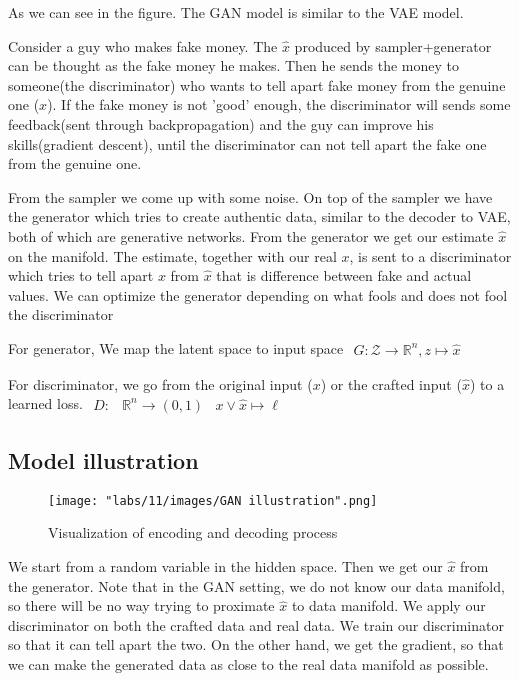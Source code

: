 As we can see in the figure. The GAN model is similar to the VAE model.

Consider a guy who makes fake money. The $\hat{x}$ produced by sampler+generator can be thought as the fake money he makes. Then he sends the money to someone(the discriminator) who wants to tell apart fake money from the genuine one ($x$). If the fake money is not 'good' enough, the discriminator will sends some feedback(sent through backpropagation) and the guy can improve his skills(gradient descent), until the discriminator can not tell apart the fake one from the genuine one. 

From the sampler we come up with some noise. On top of the sampler we have the generator which tries to create authentic data, similar to the decoder to VAE, both of which are generative networks. From the generator we get our estimate $\hat{x}$on the manifold. The estimate, together with our real $x$, is sent to a discriminator which tries to tell apart $x$ from $\hat{x}$ that is difference between fake and actual values. We can optimize the generator depending on what fools and does not fool the discriminator

For generator, We map the latent space to input space $\begin{array}{r}{G : \mathcal{Z} \rightarrow \mathbb{R}^{n}}, {z \mapsto \hat{x}}\end{array}$

For discriminator, we go from the original input ($x$) or the crafted input ($\hat{x}$) to a learned loss. $\begin{aligned} D : & \mathbb{R}^{n} \rightarrow(0,1) & x \vee \hat{x} \mapsto \ell \end{aligned}$

\subsection{Model illustration}

\begin{figure}
    \centering
    \texttt{[image: "labs/11/images/GAN illustration".png]}
    \caption{Visualization of encoding and decoding process}
    \label{fig:GAN encoding-decoding process}
\end{figure}

We start from a random variable in the hidden space. Then we get our $\hat{x}$ from the generator. Note that in the GAN setting, we do not know our data manifold, so there will be no way trying to proximate $\hat{x}$ to data manifold. We apply our discriminator on both the crafted data and real data. We train our discriminator so that it can tell apart the two. On the other hand, we get the gradient, so that we can make the generated data as close to the real data manifold as possible. \\ 


